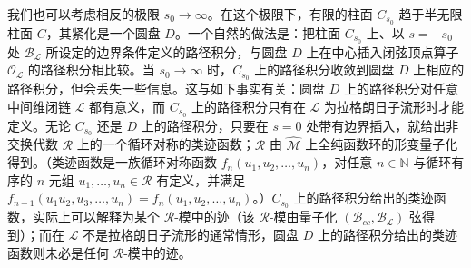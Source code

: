 \documentclass[11pt,a4paper,UTF8]{ctexart}
\theoremstyle{plain}
\theoremstyle{definition}
\begin{document}
我们也可以考虑相反的极限 $s_0\to\infty$。在这个极限下，有限的柱面 $C_{s_0}$ 趋于半无限柱面 $C$，其紧化是一个圆盘 $D$。一个自然的做法是：把柱面 $C_{s_0}$ 上、以 $s=-s_0$ 处 $\mathcal{B}_{\mathcal L}$ 所设定的边界条件定义的路径积分，与圆盘 $D$ 上在中心插入闭弦顶点算子 $\mathcal{O}_{\mathcal L}$ 的路径积分相比较。当 $s_0\to\infty$ 时，$C_{s_0}$ 上的路径积分收敛到圆盘 $D$ 上相应的路径积分，但会丢失一些信息。这与如下事实有关：圆盘 $D$ 上的路径积分对任意中间维闭链 $\mathcal L$ 都有意义，而 $C_{s_0}$ 上的路径积分只有在 $\mathcal L$ 为拉格朗日子流形时才能定义。无论 $C_{s_0}$ 还是 $D$ 上的路径积分，只要在 $s=0$ 处带有边界插入，就给出非交换代数 $\mathcal{R}$ 上的一个循环对称的类迹函数；$\mathcal{R}$ 由 $\widehat{\mathcal M}$ 上全纯函数环的形变量子化得到。（类迹函数是一族循环对称函数 $f_n(u_1,u_2,\dots,u_n)$，对任意 $n\in\mathbb N$ 与循环有序的 $n$ 元组 $u_1,\dots,u_n\in\mathcal{R}$ 有定义，并满足 $f_{n-1}(u_1u_2,u_3,\dots,u_n)=f_n(u_1,u_2,\dots,u_n)$。）$C_{s_0}$ 上的路径积分给出的类迹函数，实际上可以解释为某个 $\mathcal{R}$-模中的迹（该 $\mathcal{R}$-模由量子化 $(\mathcal{B}_{cc},\mathcal{B}_{\mathcal L})$ 弦得到）；而在 $\mathcal L$ 不是拉格朗日子流形的通常情形，圆盘 $D$ 上的路径积分给出的类迹函数则未必是任何 $\mathcal{R}$-模中的迹。




\end{document}
